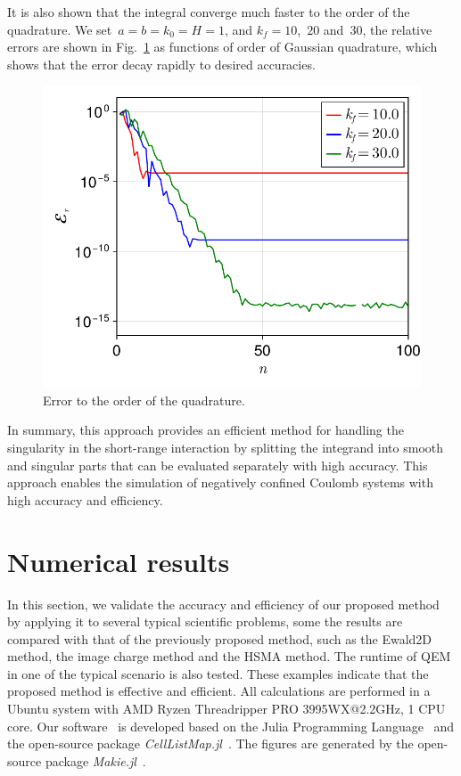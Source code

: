 It is also shown that the integral converge much faster to the order of the quadrature.
We set~$a = b = k_0 = H = 1$, and $k_f = 10$,~$20$ and~$30$, the relative errors are shown in Fig.~\ref{fig:error} as functions of order of Gaussian quadrature, which shows that the error decay rapidly to desired accuracies.

\begin{figure}[htbp]
    \centering
    \includegraphics[width = 0.5\linewidth]{figs/int_convergence.pdf}
    \caption{Error to the order of the quadrature.}
    \label{fig:error}
\end{figure}

In summary, this approach provides an efficient method for handling the singularity in the short-range interaction by splitting the integrand into smooth and singular parts that can be evaluated separately with high accuracy.
This approach enables the simulation of negatively confined Coulomb systems with high accuracy and efficiency.

\section{Numerical results}
\label{sec:result}

In this section, we validate the accuracy and efficiency of our proposed method by applying it to several typical scientific problems, some the results are compared with that of the previously proposed method, such as the Ewald2D method, the image charge method and the HSMA method.
The runtime of QEM in one of the typical scenario is also tested.
These examples indicate that the proposed method is effective and efficient.
All calculations are performed in a Ubuntu system with AMD Ryzen Threadripper PRO 3995WX@2.2GHz, 1 CPU core.
Our software~\cite{QuasiEwald} is developed based on the Julia Programming Language~\cite{Julia-2017} and the open-source package \emph{CellListMap.jl}~\cite{celllistmap}.
The figures are generated by the open-source package \emph{Makie.jl}~\cite{DanischKrumbiegel2021}.

